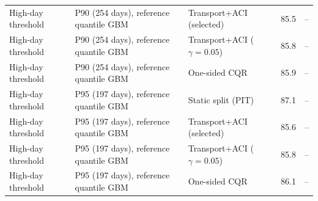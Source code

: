 \begin{table}[tp]
\begin{tabular}{l l l rr}
High-day threshold & P90 (254 days), reference quantile GBM & Transport+ACI (selected) & 85.5 & -- \\
High-day threshold & P90 (254 days), reference quantile GBM & Transport+ACI ($\gamma=0.05$) & 85.8 & -- \\
High-day threshold & P90 (254 days), reference quantile GBM & One-sided CQR & 85.9 & -- \\
High-day threshold & P95 (197 days), reference quantile GBM & Static split (PIT) & 87.1 & -- \\
High-day threshold & P95 (197 days), reference quantile GBM & Transport+ACI (selected) & 85.6 & -- \\
High-day threshold & P95 (197 days), reference quantile GBM & Transport+ACI ($\gamma=0.05$) & 85.8 & -- \\
High-day threshold & P95 (197 days), reference quantile GBM & One-sided CQR & 86.1 & -- \\
\bottomrule
\end{tabular}
\end{table}

